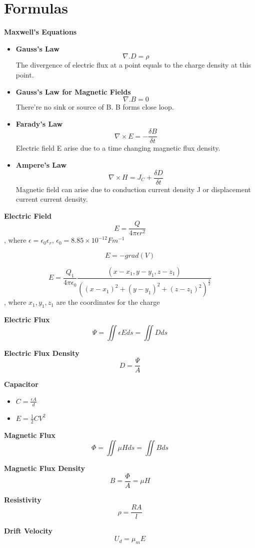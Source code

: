 \documentclass{article}
\begin{document}
\Large
  \section{Formulas}
  \textbf{Maxwell's Equations}
\begin{itemize}
\item \textbf{Gauss's Law}  $$ \nabla .D = \rho $$
The divergence of electric flux at a point equals to the charge density at this point.
\item \textbf{Gauss's Law for Magnetic Fields}   $$\nabla .B = 0$$
There're no sink or source of B. B forms close loop.
\item  \textbf{Farady's Law}  $$\nabla \times E = -\frac{\delta B}{\delta t}$$
Electric field E arise due to a time changing magnetic flux density.
\item  \textbf{Ampere's Law}  $$\nabla \times H = J_C + \frac{\delta D}{\delta t}$$
Magnetic field can arise due to conduction current density J or displacement current current density.
\end{itemize}
  \textbf{Electric Field}
  $$E = \frac{Q}{4\pi \epsilon r^2}$$, where $\epsilon = \epsilon_0 \epsilon_r$, $\epsilon_0 = 8.85 \times 10^{-12}Fm^{-1}$
  
  $$E = -grad(V)$$

  $$E = \frac{Q_1}{4\pi\epsilon_0}\frac{(x-x_1,y-y_1,z-z_1)}{((x-x_1)^2+(y-y_1)^2+(z-z_1)^2)^\frac{3}{2}}$$, where $x_1,y_1,z_1$ are the coordinates for the charge
  
  \textbf{Electric Flux}
  $$\Psi = \iint\epsilon E ds = \iint Dds $$
  
  
  \textbf{Electric Flux Density}
  $$D = \frac{\Psi}{A}$$

  \textbf{Capacitor}
  \begin{itemize}
  \item $ C = \frac{\epsilon A}{d}$
  \item $E = \frac{1}{2}CV^2$
  \end{itemize}      
  
  \textbf{Magnetic Flux}
  $$ \Phi = \iint \mu Hds = \iint Bds $$
  
  \textbf{Magnetic Flux Density}
  $$B = \frac{\Phi}{A} = \mu H$$
  
  
  \textbf{Resistivity}
  $$\rho = \frac{RA}{l}$$
  
  \textbf{Drift Velocity}
  $$U_d = \mu_m E$$
  
\end{document}
